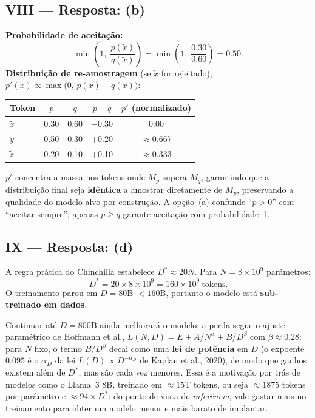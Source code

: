 \documentclass{dlproblemset}
\begin{document}
\subsection*{VIII — Resposta: (b)}
\textbf{Probabilidade de aceitação:}
\[
  \min\!\left(1,\;\frac{p(\tilde{x})}{q(\tilde{x})}\right)
  = \min\!\left(1,\;\frac{0.30}{0.60}\right) = 0.50.
\]
\textbf{Distribuição de re-amostragem} (se $\tilde{x}$ for rejeitado),
$p'(x) \propto \max\!\bigl(0,\, p(x) - q(x)\bigr)$:
\begin{center}
\begin{tabular}{lcccc}
  \toprule
  Token & $p$ & $q$ & $p - q$ & $p'$ (normalizado) \\
  \midrule
  $\tilde{x}$ & 0.30 & 0.60 & $-$0.30 & 0.00 \\
  $\tilde{y}$ & 0.50 & 0.30 & $+$0.20 & $\approx$0.667 \\
  $\tilde{z}$ & 0.20 & 0.10 & $+$0.10 & $\approx$0.333 \\
  \bottomrule
\end{tabular}
\end{center}
$p'$ concentra a massa nos tokens onde $M_p$ supera $M_q$, garantindo que a
distribuição final seja \textbf{idêntica} a amostrar diretamente de $M_p$,
preservando a qualidade do modelo alvo por construção. A opção~(a) confunde
``$p > 0$'' com ``aceitar sempre''; apenas $p \ge q$ garante aceitação com
probabilidade~1.

\subsection*{IX — Resposta: (d)}
A regra prática do Chinchilla estabelece $D^* \approx 20N$.
Para $N = 8 \times 10^9$ parâmetros:
\[
  D^* = 20 \times 8 \times 10^9 = 160 \times 10^9\ \text{tokens}.
\]
O treinamento parou em $D = 80$B $< 160$B, portanto o modelo está
\textbf{sub-treinado em dados}.

Continuar até $D = 800$B ainda melhorará o modelo:
a perda segue o ajuste paramétrico de Hoffmann et al.,
$L(N, D) = E + A/N^{\alpha} + B/D^{\beta}$ com $\beta \approx 0.28$: para $N$ fixo,
o termo $B/D^{\beta}$ decai como uma \textbf{lei de potência} em $D$ (o expoente
$0.095$ é o $\alpha_D$ da lei $L(D) \propto D^{-\alpha_D}$ de Kaplan et al., 2020),
de modo que ganhos existem além de $D^*$, mas são cada vez menores. Essa é a motivação por trás de modelos como o Llama~3 8B,
treinado em ${\approx}15$T tokens, ou seja ${\approx}1875$ tokens por parâmetro e
${\approx}94 \times D^*$: do ponto de
vista de \emph{inferência}, vale gastar mais no treinamento para obter
um modelo menor e mais barato de implantar.
\end{document}
